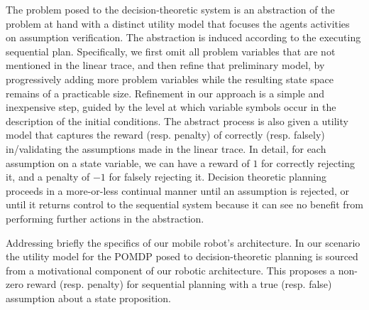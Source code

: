 The problem posed to the decision-theoretic system is an abstraction
of the problem at hand with a distinct utility model that focuses the
agents activities on assumption verification. The abstraction is
induced according to the executing sequential plan. Specifically, we
first omit all problem variables that are not mentioned in the linear
trace, and then refine that preliminary model, by progressively adding
more problem variables while the resulting state space remains of a
practicable size. Refinement in our approach is a simple and
inexpensive step, guided by the level at which variable symbols occur
in the description of the initial conditions. The abstract process is
also given a utility model that captures the reward (resp. penalty) of
correctly (resp. falsely) in/validating the assumptions made in the
linear trace. In detail, for each assumption on a state variable, we
can have a reward of $1$ for correctly rejecting it, and a penalty of
$-1$ for falsely rejecting it. Decision theoretic planning proceeds in
a more-or-less continual manner until an assumption is rejected, or
until it returns control to the sequential system because it can see
no benefit from performing further actions in the abstraction.



Addressing briefly the specifics of our mobile robot's
architecture. In our scenario the utility model for the POMDP posed to
decision-theoretic planning is sourced from a motivational component
of our robotic architecture. This proposes a non-zero reward
(resp. penalty) for sequential planning with a true (resp. false)
assumption about a state proposition.


